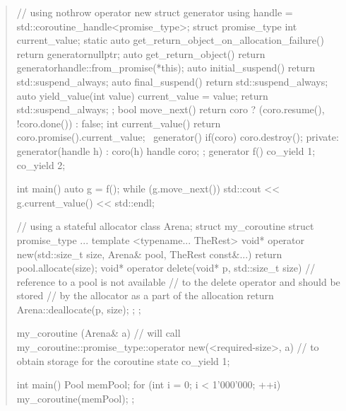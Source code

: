 \begin{quote}
\enterexample
\begin{codeblock}
// using nothrow operator new
struct generator {
  using handle = std::coroutine_handle<promise_type>;
  struct promise_type {
    int current_value;
    static auto get_return_object_on_allocation_failure() { return generator{nullptr}; }
    auto get_return_object() { return generator{handle::from_promise(*this)}; }
    auto initial_suspend() { return std::suspend_always{}; }
    auto final_suspend() { return std::suspend_always{}; }
    auto yield_value(int value) { 
      current_value = value; 
      return std::suspend_always{};
    }
  };
  bool move_next() { return coro ? (coro.resume(), !coro.done()) : false; }
  int current_value() { return coro.promise().current_value; }
  ~generator() { if(coro) coro.destroy(); }
private:
  generator(handle h) : coro(h) {}
  handle coro;
};
generator f() { co_yield 1;  co_yield 2; }
 
int main() {
  auto g = f();
  while (g.move_next()) std::cout << g.current_value() << std::endl;
}

\end{codeblock}
\exitexample

\pnum
\enterexample
\begin{codeblock}
  // using a stateful allocator
  class Arena;
  struct my_coroutine {
    struct promise_type {
      ...
      template <typename... TheRest>
      void* operator new(std::size_t size, Arena& pool, TheRest const&...) {
        return pool.allocate(size);
      }
      void* operator delete(void* p, std::size_t size) {
      	// reference to a pool is not available
      	// to the delete operator and should be stored
      	// by the allocator as a part of the allocation
        return Arena::deallocate(p, size);
      }
    };
  };
  
  my_coroutine (Arena& a) {
    // will call my_coroutine::promise_type::operator new(<required-size>, a)
    // to obtain storage for the coroutine state
    co_yield 1;
  }
  
  int main() {
    Pool memPool;
    for (int i = 0; i < 1'000'000; ++i) my_coroutine(memPool);
  };
\end{codeblock}
\exitexample
\end{quote}